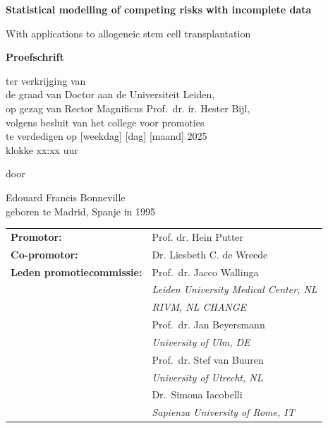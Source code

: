 \documentclass[
  letterpaper,
  paper=240mm:170mm,
  twoside=true,
  open=right,
  fontsize=10pt,
  pagesize=false,
  BCOR=15mm,
  DIV=14,
  headinclude=true,
  footinclude=false,
  headsepline=on]{scrbook}
\newcommand{\bsf}[1]{\textbf{\textsf{#1}}}
\begin{document}
\begin{center}
  \bsf{\huge Statistical modelling of competing risks with incomplete
data} \par %
  \smallskip
  \textsf{\Large With applications to allogeneic stem cell
transplantation} \par
  \vfill
  \textbf{\large Proefschrift} \par
  \vspace{2\baselineskip}
  \large{
    ter verkrijging van \\
    de graad van Doctor aan de Universiteit Leiden, \\
    op gezag van Rector Magnificus Prof.~dr. ir. Hester Bijl, \\
    volgens besluit van het college voor promoties \\
    te verdedigen op {[}weekdag{]} {[}dag{]} {[}maand{]} 2025  \\
    klokke xx:xx uur
  } \par
  \vspace{2\baselineskip}
  \large{door} \par
  \vspace{2\baselineskip}
  \large{Edouard Francis Bonneville} \\
  \normalsize{geboren te Madrid, Spanje in 1995} \par
\end{center}


\clearpage
\thispagestyle{empty}

\noindent\begin{tabular}{p{14em} l}
    \normalsize\bsf{Promotor:} & \normalsize Prof. dr. Hein Putter \\
    \rule{0pt}{4ex}\normalsize\bsf{Co-promotor:} & \normalsize Dr. Liesbeth C. de Wreede \\
    \normalsize
    \rule{0pt}{8ex}\bsf{Leden promotiecommissie:}
     &
      \rule{0pt}{4ex}\normalsize Prof.~dr. Jacco Wallinga
       \\[0.2mm] &
        \indent\textit{Leiden University Medical Center, NL}
       \\[0.2mm] &
        \indent\textit{RIVM, NL CHANGE}
       \\
     &
      \rule{0pt}{4ex}\normalsize Prof.~dr. Jan Beyersmann
       \\[0.2mm] &
        \indent\textit{University of Ulm, DE}
       \\
     &
      \rule{0pt}{4ex}\normalsize Prof.~dr. Stef van Buuren
       \\[0.2mm] &
        \indent\textit{University of Utrecht, NL}
       \\
     &
      \rule{0pt}{4ex}\normalsize Dr.~Simona Iacobelli
       \\[0.2mm] &
        \indent\textit{Sapienza University of Rome, IT}
       \\
    
\end{tabular}
\end{document}
